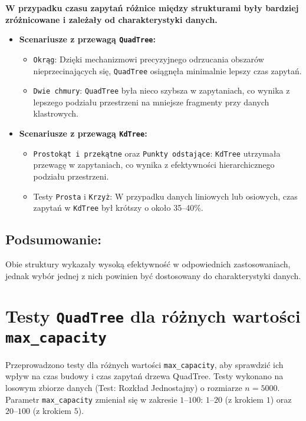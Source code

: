 \documentclass[12pt]{article}
\begin{document}
\noindent \textbf{W przypadku czasu zapytań różnice między strukturami były bardziej zróżnicowane i zależały od charakterystyki danych.}

\begin{itemize}
    \item \textbf{Scenariusze z przewagą \texttt{QuadTree}:}
    \begin{itemize}
        \item \texttt{Okrąg}: Dzięki mechanizmowi precyzyjnego odrzucania obszarów nieprzecinających się, \texttt{QuadTree} osiągnęła minimalnie lepszy czas zapytań.
        \item \texttt{Dwie chmury}: \texttt{QuadTree} była nieco szybsza w zapytaniach, co wynika z lepszego podziału przestrzeni na mniejsze fragmenty przy danych klastrowych.
    \end{itemize}
    
    \item \textbf{Scenariusze z przewagą \texttt{KdTree}:}
    \begin{itemize}
        \item \texttt{Prostokąt i przekątne} oraz \texttt{Punkty odstające}: \texttt{KdTree} utrzymała przewagę w zapytaniach, co wynika z efektywności hierarchicznego podziału przestrzeni.
        \item Testy \texttt{Prosta} i \texttt{Krzyż}: W przypadku danych liniowych lub osiowych, czas zapytań w \texttt{KdTree} był krótszy o około 35–40\%.
    \end{itemize}
\end{itemize}

\subsection{Podsumowanie:}


\noindent Obie struktury wykazały wysoką efektywność w odpowiednich zastosowaniach, jednak wybór jednej z nich powinien być dostosowany do charakterystyki danych.

\newpage
\section{Testy \texttt{QuadTree} dla różnych wartości \texttt{max\_capacity}}

Przeprowadzono testy dla różnych wartości \texttt{max\_capacity}, aby sprawdzić ich wpływ na czas budowy i czas zapytań drzewa QuadTree. Testy wykonano na losowym zbiorze danych (Test: Rozkład Jednostajny) o rozmiarze \( n = 5000 \). Parametr \texttt{max\_capacity} zmieniał się w zakresie \( 1 \)–\( 100 \):
\( 1 \)–\( 20 \) (z krokiem \( 1 \)) oraz \( 20 \)–\( 100 \) (z krokiem \( 5 \)).
\end{document}
